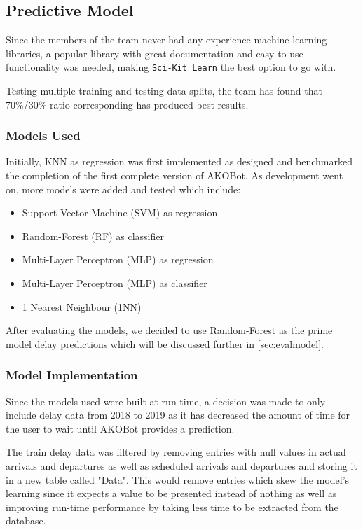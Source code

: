 \documentclass[11pt]{article}
\newcommand{\code}[1]{{\texttt{#1}}}
\begin{document}
    \subsection{Predictive Model}
    Since the members of the team never had any experience machine learning libraries, a popular library with great documentation and easy-to-use functionality was needed, making \code{Sci-Kit Learn} the best option to go with. 
    
    Testing multiple training and testing data splits, the team has found that 70\%/30\%  ratio corresponding has produced best results. 
    
        \subsubsection{Models Used}
        Initially, KNN as regression was first implemented as designed and benchmarked the completion of the first complete version of AKOBot. As development went on, more models were added and tested which include:
        
        \begin{itemize}
            \item Support Vector Machine (SVM) as regression
            \item Random-Forest (RF) as classifier
            \item Multi-Layer Perceptron (MLP) as regression
            \item Multi-Layer Perceptron (MLP) as classifier
            \item 1 Nearest Neighbour (1NN)
        \end{itemize}
        
        After evaluating the models, we decided to use Random-Forest as the prime model delay predictions which will be discussed further in \cref{sec:evalmodel}.
        
        \subsubsection{Model Implementation}
        Since the models used were built at run-time, a decision was made to only include delay data from 2018 to 2019 as it has decreased the amount of time for the user to wait until AKOBot provides a prediction.
        
        The train delay data was filtered by removing entries with null values in actual arrivals and departures as well as scheduled arrivals and departures and storing it in a new table called "Data". This would remove entries which skew the model's learning since it expects a value to be presented instead of nothing as well as improving run-time performance by taking less time to be extracted from the database.
        
\end{document}
